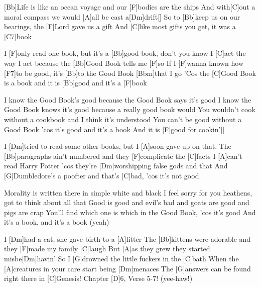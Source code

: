 

\begin{guitar}
	\small {}
	[Bb]Life is like an ocean voyage and our [F]bodies are the ships
	And with[C]out a moral compass we would [A]all be cast a[Dm]drift[]{}
	So to [Bb]keep us on our bearings, the [F]Lord gave us a gift
	And [C]like most gifts you get, it was a [C7]book
	
	I [F]only read one book, but it's a [Bb]good book, don't you know
	I [C]act the way I act because the [Bb]Good Book tells me [F]so
	If I [F]wanna known how [F7]to be good, it's [Bb]to the Good Book [Bbm]that I go
	'Cos the [C]Good Book is a book and it is [Bb]good and it's a [F]book
	
	I know the Good Book's good because the Good Book says it's good
	I know the Good Book knows it's good because a really good book would
	You wouldn't cook without a cookbook and I think it's understood
	You can't be good without a Good Book 'cos it's good and it's a book
	And it is [F]good for cookin'[]{}
	
	I [Dm]tried to read some other books, but I [A]soon gave up on that.
	The [Bb]paragraphs ain't numbered and they [F]complicate the [C]facts
	I [A]can't read Harry Potter 'cos they're [Dm]worshipping false gods and that
	And [G]Dumbledore's a poofter and that's [C]bad, 'cos it's not good.
	
	Morality is written there in simple white and black
	I feel sorry for you heathens, got to think about all that
	Good is good and evil's bad and goats are good and pigs are crap
	You'll find which one is which in the Good Book, 'cos it's good
	And it's a book, and it's a book (yeah)
	
	I [Dm]had a cat, she gave birth to a [A]litter
	The [Bb]kittens were adorable and they [F]made my family [C]laugh
	But [A]as they grew they started misbe[Dm]havin'
	So I [G]drowned the little fuckers in the [C]bath
	When the [A]creatures in your care start being [Dm]menaces
	The [G]answers can be found right there in [C]Genesis!
	Chapter [D]6, Verse 5-7! (yee-haw!)
	

\end{guitar}
